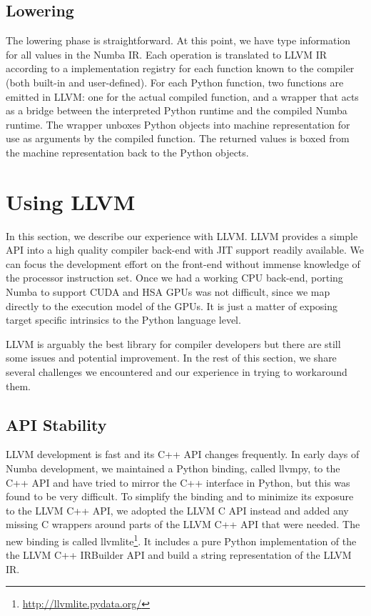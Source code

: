 \documentclass{acm_proc_article-sp}
\begin{document}
\subsection{Lowering}

The lowering phase is straightforward.  At this point, we have type
information for all values in the Numba IR. Each operation is
translated to LLVM IR according to a implementation registry for each
function known to the compiler (both built-in and user-defined).  For
each Python function, two functions are emitted in LLVM: one for the
actual compiled function, and a wrapper that acts as a bridge
between the interpreted Python runtime and the compiled Numba
runtime. The wrapper unboxes Python objects into machine
representation for use as arguments by the compiled function.  The
returned values is boxed from the machine representation back to the
Python objects.

\section{Using LLVM}

In this section, we describe our experience with LLVM.
LLVM provides a simple API into a high quality compiler back-end with
JIT support readily available. We can focus the development effort
on the front-end without immense knowledge of the processor instruction set.
Once we had a working CPU back-end, porting Numba to support CUDA and HSA GPUs
was not difficult, since we map directly to the execution model of the GPUs.
It is just a matter of exposing target specific intrinsics to the Python
language level.

LLVM is arguably the best library for compiler developers but there are still
some issues and potential improvement. In the rest of
this section, we share several challenges we encountered and our experience
in trying to workaround them.

\subsection{API Stability}

LLVM development is fast and its C++ API changes frequently.  In early
days of Numba development, we maintained a Python binding, called
llvmpy, to the C++ API and have tried to mirror the C++ interface in
Python, but this was found to be very difficult.  To simplify the
binding and to minimize its exposure to the LLVM C++ API, we adopted
the LLVM C API instead and added any missing C wrappers around parts
of the LLVM C++ API that were needed.  The new binding is called
llvmlite\footnote{\url{http://llvmlite.pydata.org/}}.  It includes a
pure Python implementation of the the LLVM C++ IRBuilder API and build
a string representation of the LLVM IR.
\end{document}
